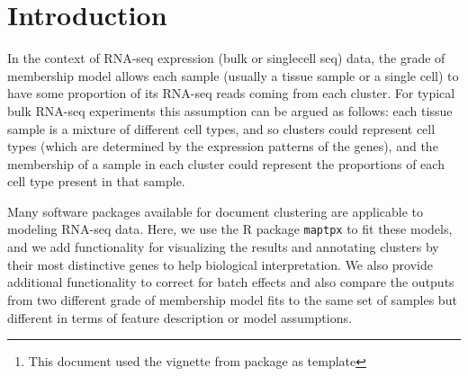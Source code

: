 \documentclass[12pt]{article}\usepackage[]{graphicx}\usepackage[usenames,dvipsnames]{color}
\author{Kushal K Dey, Chiaowen Joyce Hsiao \& Matthew Stephens \\[1em] \small{\textit{Stephens Lab}, The University of Chicago} \mbox{ }\\ \small{\texttt{$^*$Correspondending Email: mstephens@uchicago.edu}}}
\newcommand{\CountClust}{\textit{CountClust}}
\begin{document}
\maketitle

\begin{abstract}
  \vspace{1em}
 Grade of membership or GoM models (also known as admixture models or Latent Dirichlet Allocation") are a generalization of cluster models that allow each sample to have membership in multiple clusters. It is widely used to model ancestry of individuals in population genetics based on SNP/ microsatellite data and also in natural language processing for modeling documents \cite{Pritchard2000, Blei2003}.

This \R{} package implements tools to visualize the clusters obtained from fitting topic models using a Structure plot \cite{Rosenberg2002} and extract the top features/genes that distinguish the clusters. In presence of known technical or batch effects, the package also allows for correction of these confounding effects.

\vspace{1em}
\textbf{\CountClust{} version:} 0.1.0 \footnote{This document used the vignette from \Bioconductor{} package  as  template}
\end{abstract}




\newpage

\tableofcontents

\section{Introduction}

In the context of RNA-seq expression (bulk or singlecell seq) data, the grade of membership model allows each sample (usually a tissue sample or a single cell) to have some proportion of its RNA-seq reads coming from each cluster. For typical bulk RNA-seq experiments this assumption
can be argued as follows: each tissue sample is a mixture of different cell types, and so clusters could represent cell types (which are determined by the expression patterns of the genes), and the membership of a sample in each cluster could represent the proportions of each cell type present in that sample.

Many software packages available for document clustering are applicable to modeling RNA-seq data. Here, we use the R package {\tt maptpx} \cite{Taddy2012} to fit these models, and we add functionality for visualizing the results and annotating clusters by their most distinctive genes to help biological interpretation. We also provide additional functionality to correct for batch effects and also compare the outputs from two different grade of membership model fits to the same set of samples but different in terms of feature description or model assumptions.
\end{document}
